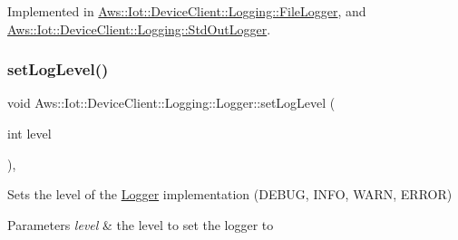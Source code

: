 Implemented in \hyperlink{class_aws_1_1_iot_1_1_device_client_1_1_logging_1_1_file_logger_a549cf9783ce070e514c0f68340ae5d1c}{Aws\+::\+Iot\+::\+Device\+Client\+::\+Logging\+::\+File\+Logger}, and \hyperlink{class_aws_1_1_iot_1_1_device_client_1_1_logging_1_1_std_out_logger_a829dd9d573157d3cbc6865b38572dd85}{Aws\+::\+Iot\+::\+Device\+Client\+::\+Logging\+::\+Std\+Out\+Logger}.

\mbox{\label{class_aws_1_1_iot_1_1_device_client_1_1_logging_1_1_logger_a01b35eb1221e3bdcf744da4954f11cb2}} 
\subsubsection{\texorpdfstring{set\+Log\+Level()}{setLogLevel()}}
{\footnotesize\ttfamily void Aws\+::\+Iot\+::\+Device\+Client\+::\+Logging\+::\+Logger\+::set\+Log\+Level (\begin{DoxyParamCaption}\item[{int}]{level }\end{DoxyParamCaption})\hspace{0.3cm}{\ttfamily [inline]}, {\ttfamily [protected]}}



Sets the level of the \hyperlink{class_aws_1_1_iot_1_1_device_client_1_1_logging_1_1_logger}{Logger} implementation (D\+E\+B\+UG, I\+N\+FO, W\+A\+RN, E\+R\+R\+OR) 


\begin{DoxyParams}{Parameters}
{\em level} & the level to set the logger to \\
\hline
\end{DoxyParams}
\mbox{\label{class_aws_1_1_iot_1_1_device_client_1_1_logging_1_1_logger_a6b80ca4200fbc58bb2994ef4319ea822}} 
